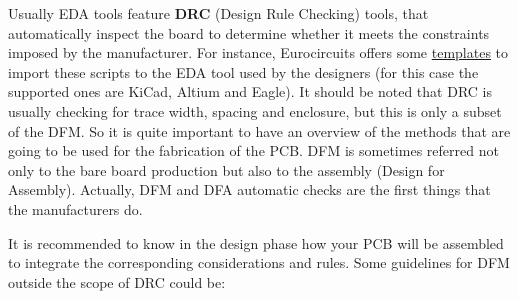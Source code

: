 \documentclass[12pt]{article}
\begin{document}
Usually EDA tools feature \textbf{DRC} (Design Rule Checking) tools, that automatically inspect the board to determine whether it meets the constraints imposed by the manufacturer.
For instance, Eurocircuits offers some \href{https://www.eurocircuits.com/drc-settings-and-guide-lines-for-cad-packages/}{templates} to import these scripts to the EDA tool used by the designers (for this case the supported ones are KiCad, Altium and Eagle). It should be noted that DRC is usually checking for trace width, spacing and enclosure, but this is only a subset of the DFM. So it is quite important to have an overview of the methods that are going to be used for the fabrication of the PCB. DFM is sometimes referred not only to the bare board production but also to the assembly (Design for Assembly). Actually, DFM and DFA automatic checks are the first things that the manufacturers do. 

It is recommended to know in the design phase how your PCB will be assembled to integrate the corresponding considerations and rules. Some guidelines for DFM outside the scope of DRC could be:
\end{document}
